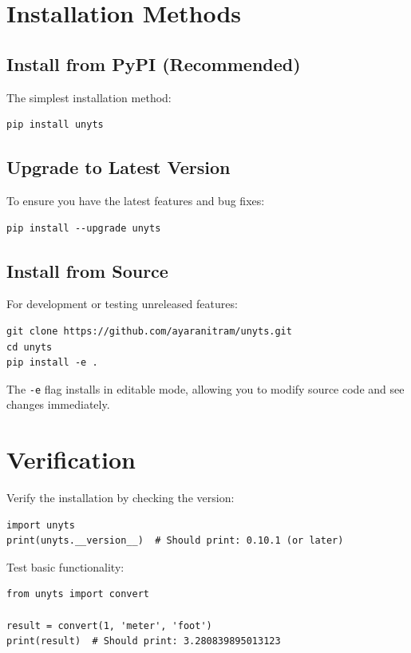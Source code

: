 \documentclass[11pt,a4paper]{report}
\begin{document}
\section{Installation Methods}

\subsection{Install from PyPI (Recommended)}

The simplest installation method:
\begin{lstlisting}[style=bashstyle]
pip install unyts
\end{lstlisting}

\subsection{Upgrade to Latest Version}

To ensure you have the latest features and bug fixes:
\begin{lstlisting}[style=bashstyle]
pip install --upgrade unyts
\end{lstlisting}

\subsection{Install from Source}

For development or testing unreleased features:
\begin{lstlisting}[style=bashstyle]
git clone https://github.com/ayaranitram/unyts.git
cd unyts
pip install -e .
\end{lstlisting}

The \texttt{-e} flag installs in editable mode, allowing you to modify source code and see changes immediately.

\section{Verification}

Verify the installation by checking the version:

\begin{lstlisting}[style=pythonstyle]
import unyts
print(unyts.__version__)  # Should print: 0.10.1 (or later)
\end{lstlisting}

Test basic functionality:

\begin{lstlisting}[style=pythonstyle]
from unyts import convert

result = convert(1, 'meter', 'foot')
print(result)  # Should print: 3.280839895013123
\end{lstlisting}
\end{document}
